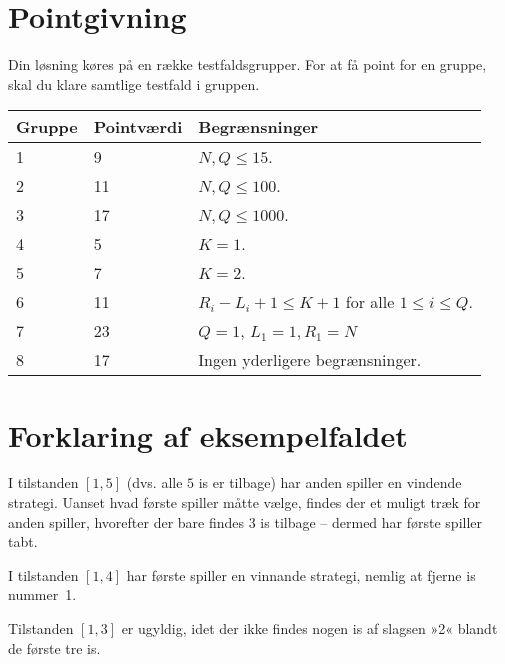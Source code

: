 \section*{Pointgivning}

Din løsning køres på en række testfaldsgrupper.
For at få point for en gruppe, skal du klare samtlige testfald i gruppen.

\noindent
\begin{tabular}{| l | l | l |}
\hline
Gruppe & Pointværdi & Begrænsninger \\ \hline
1     & 9          &  $N,Q \le 15$.\\ \hline
2     & 11         &  $N,Q \le 100$. \\ \hline
3     & 17         &  $N,Q \le 1000$. \\ \hline
4     & 5          &  $K=1$. \\ \hline
5     & 7          &  $K=2$. \\ \hline
6     & 11         &  $R_i - L_i + 1 \le K+1$ for alle $1 \le i \le Q$. \\ \hline
7     & 23         &  $Q=1$, $L_1=1, R_1=N$ \\ \hline
8     & 17         &  Ingen yderligere begrænsninger. \\ \hline
\end{tabular}

\section*{Forklaring af eksempelfaldet}

I tilstanden $[1,5]$ (dvs. alle $5$ is er tilbage) har anden spiller en vindende strategi.
Uanset hvad første spiller måtte vælge, findes der et muligt træk for anden spiller, hvorefter der bare findes $3$ is tilbage -- dermed har  første spiller tabt.

I tilstanden $[1,4]$ har første spiller  en vinnande strategi, nemlig at fjerne is nummer~1.

Tilstanden $[1,3]$ er ugyldig, idet der ikke findes nogen is af slagsen »2« blandt de første tre is.

